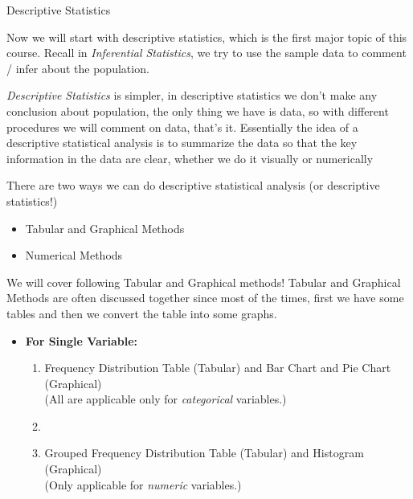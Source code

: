\documentclass[8pt, usepdftitle=false]{beamer}
\begin{document}
\begin{frame}[allowframebreaks]{Descriptive Statistics}
\begin{itemize}

   \item Now we will start with descriptive statistics, which is the first major topic of this course. Recall in \emph{Inferential Statistics}, we try to use the sample data to \alert{comment / infer} about the population.

   \item \emph{Descriptive Statistics} is simpler, in descriptive statistics we don't make any conclusion about population, the only thing we have is data, so with different procedures we will comment on data, that's it.  Essentially the idea of a descriptive statistical analysis is  to \alert{summarize the data} so that the key information \alert{in the data} are clear, whether we do it \alert{visually or numerically}


  \item There are two ways we can do descriptive statistical analysis (or descriptive statistics!)

  \begin{itemize}
    \fontsize{8}{12}\selectfont
     \item Tabular and Graphical Methods
     \item Numerical Methods
   \end{itemize} 

 \framebreak

\normalsize{
\item We will cover following Tabular and Graphical methods! Tabular and Graphical Methods are often discussed together since most of the times, first we have some tables and then we convert the table into some graphs. 

\begin{itemize}
  \normalsize
  \medskip
  \item \textbf{For Single Variable:}
  \medskip
  \begin{enumerate}
    \normalsize
      \item \alert{Frequency Distribution Table (Tabular)} and \alert{Bar Chart and Pie Chart (Graphical)}\\
            (All are applicable only for \emph{categorical} variables.)
      \item[]
      \item \alert{Grouped Frequency Distribution Table (Tabular)} and \alert{Histogram (Graphical)}\\
            (Only applicable for \emph{numeric} variables.)
  \end{enumerate}
  


\end{itemize}}
\end{itemize}
\end{frame}
\end{document}
